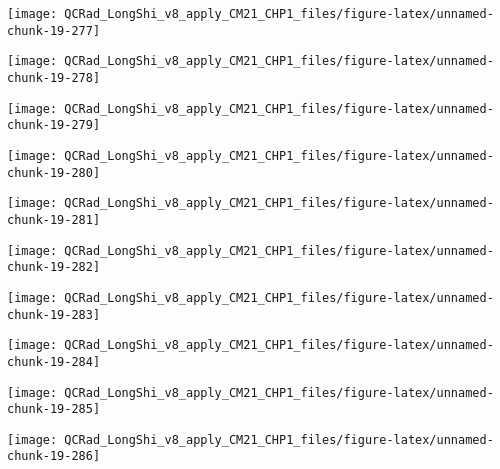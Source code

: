 \documentclass[
  10pt,
  a4paper,oneside]{article}
\begin{document}
\begin{center}\texttt{[image: QCRad\_LongShi\_v8\_apply\_CM21\_CHP1\_files/figure-latex/unnamed-chunk-19-277]} \end{center}

\begin{center}\texttt{[image: QCRad\_LongShi\_v8\_apply\_CM21\_CHP1\_files/figure-latex/unnamed-chunk-19-278]} \end{center}

\begin{center}\texttt{[image: QCRad\_LongShi\_v8\_apply\_CM21\_CHP1\_files/figure-latex/unnamed-chunk-19-279]} \end{center}

\begin{center}\texttt{[image: QCRad\_LongShi\_v8\_apply\_CM21\_CHP1\_files/figure-latex/unnamed-chunk-19-280]} \end{center}

\begin{center}\texttt{[image: QCRad\_LongShi\_v8\_apply\_CM21\_CHP1\_files/figure-latex/unnamed-chunk-19-281]} \end{center}

\begin{center}\texttt{[image: QCRad\_LongShi\_v8\_apply\_CM21\_CHP1\_files/figure-latex/unnamed-chunk-19-282]} \end{center}

\begin{center}\texttt{[image: QCRad\_LongShi\_v8\_apply\_CM21\_CHP1\_files/figure-latex/unnamed-chunk-19-283]} \end{center}

\begin{center}\texttt{[image: QCRad\_LongShi\_v8\_apply\_CM21\_CHP1\_files/figure-latex/unnamed-chunk-19-284]} \end{center}

\begin{center}\texttt{[image: QCRad\_LongShi\_v8\_apply\_CM21\_CHP1\_files/figure-latex/unnamed-chunk-19-285]} \end{center}

\begin{center}\texttt{[image: QCRad\_LongShi\_v8\_apply\_CM21\_CHP1\_files/figure-latex/unnamed-chunk-19-286]} \end{center}
\end{document}

